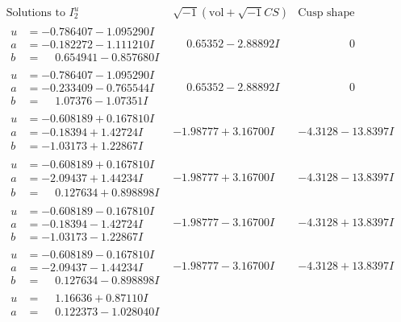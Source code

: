\documentclass[1p]{elsarticle_modified}
\theoremstyle{definition}
\newcommand{\I}{\sqrt{-1}}
\begin{document}
$$\begin{array}{c|c|c}
\text{Solutions to }I^u_{2}& \I (\text{vol} + \sqrt{-1}CS) & \text{Cusp shape}\\
 \hline 
\begin{aligned}
u &= -0.786407 - 1.095290 I \\
a &= -0.182272 - 1.111210 I \\
b &= \phantom{-}0.654941 - 0.857680 I\end{aligned}
 & \phantom{-}0.65352 - 2.88892 I & \phantom{-0.000000 } 0 \\ \hline\begin{aligned}
u &= -0.786407 - 1.095290 I \\
a &= -0.233409 - 0.765544 I \\
b &= \phantom{-}1.07376 - 1.07351 I\end{aligned}
 & \phantom{-}0.65352 - 2.88892 I & \phantom{-0.000000 } 0 \\ \hline\begin{aligned}
u &= -0.608189 + 0.167810 I \\
a &= -0.18394 + 1.42724 I \\
b &= -1.03173 + 1.22867 I\end{aligned}
 & -1.98777 + 3.16700 I & -4.3128 - 13.8397 I \\ \hline\begin{aligned}
u &= -0.608189 + 0.167810 I \\
a &= -2.09437 + 1.44234 I \\
b &= \phantom{-}0.127634 + 0.898898 I\end{aligned}
 & -1.98777 + 3.16700 I & -4.3128 - 13.8397 I \\ \hline\begin{aligned}
u &= -0.608189 - 0.167810 I \\
a &= -0.18394 - 1.42724 I \\
b &= -1.03173 - 1.22867 I\end{aligned}
 & -1.98777 - 3.16700 I & -4.3128 + 13.8397 I \\ \hline\begin{aligned}
u &= -0.608189 - 0.167810 I \\
a &= -2.09437 - 1.44234 I \\
b &= \phantom{-}0.127634 - 0.898898 I\end{aligned}
 & -1.98777 - 3.16700 I & -4.3128 + 13.8397 I \\ \hline\begin{aligned}
u &= \phantom{-}1.16636 + 0.87110 I \\
a &= \phantom{-}0.122373 - 1.028040 I \\

\end{aligned}
\end{array}$$
\end{document}
